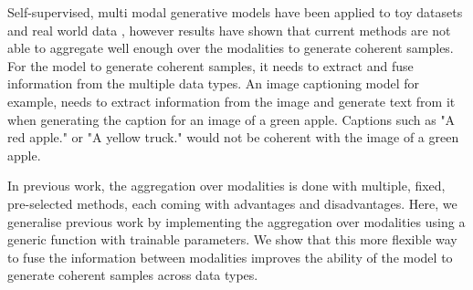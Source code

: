 Self-supervised, multi modal generative models have been applied to toy datasets \citep{poe, shi_variational_2019, sutter_generalized_2020} and real world data \citep{klug_multimodal_nodate}, however results have shown that current methods are not able to aggregate well enough over the modalities to generate coherent samples.
For the model to generate coherent samples, it needs to extract and fuse information from the multiple data types.
An image captioning model for example, needs to extract information from the image and generate text from it when generating the caption for an image of a green apple.
Captions such as "A red apple." or "A yellow truck." would not be coherent with the image of a green apple.

In previous work, the aggregation over modalities is done with multiple, fixed, pre-selected methods, each coming with advantages and disadvantages.
Here, we generalise previous work by implementing the aggregation over modalities using a generic function with trainable parameters.
We show that this more flexible way to fuse the information between modalities improves the ability of the model to generate coherent samples across data types.